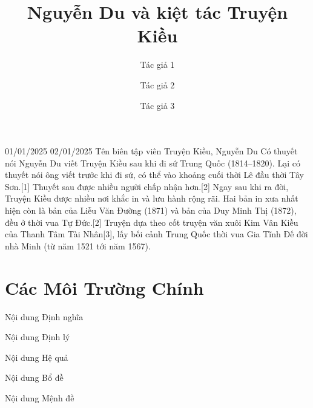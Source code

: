 



\resetsections
\resetarticledata
\resetalltheorems


\begin{frontmatter}

\title{Nguyễn Du và kiệt tác Truyện Kiều}

\author[First]{Tác giả 1}
\author[Second]{Tác giả 2}
\author[Third]{Tác giả 3}


\address[First]{Thông tin tác giả 1 }
\address[Second]{Thông tin tác giả 2}
\address[Third]{Thông tin tác giả 3}

\end{frontmatter}

\VnArticleInfo
  {01/01/2025} %
  {02/01/2025} %
  {Tên biên tập viên} %
  {Truyện Kiều, Nguyễn Du} %
  {Có thuyết nói Nguyễn Du viết Truyện Kiều sau khi đi sứ Trung Quốc
(1814–1820). Lại có thuyết nói ông viết trước khi đi sứ, có thể vào khoảng cuối
thời Lê đầu thời Tây Sơn.[1] Thuyết sau được nhiều người chấp nhận hơn.[2]
Ngay sau khi ra đời, Truyện Kiều được nhiều nơi khắc in và lưu hành rộng rãi.
Hai bản in xưa nhất hiện còn là bản của Liễu Văn Đường (1871) và bản của
Duy Minh Thị (1872), đều ở thời vua Tự Đức.[2] Truyện dựa theo cốt truyện
văn xuôi Kim Vân Kiều của Thanh Tâm Tài Nhân[3], lấy bối cảnh Trung Quốc
thời vua Gia Tĩnh Đế đời nhà Minh (từ năm 1521 tới năm 1567).} %
\section{Các Môi Trường Chính}


\begin{dn}
    Nội dung Định nghĩa 
\end{dn}

\begin{dl}
   Nội dung Định lý
\end{dl}

\begin{cm}
    
\end{cm}

\begin{hq}
    Nội dung Hệ quả
\end{hq}

\begin{bd}
    Nội dung Bổ đề
\end{bd}

\begin{md}
    Nội dung Mệnh đề
\end{md}

